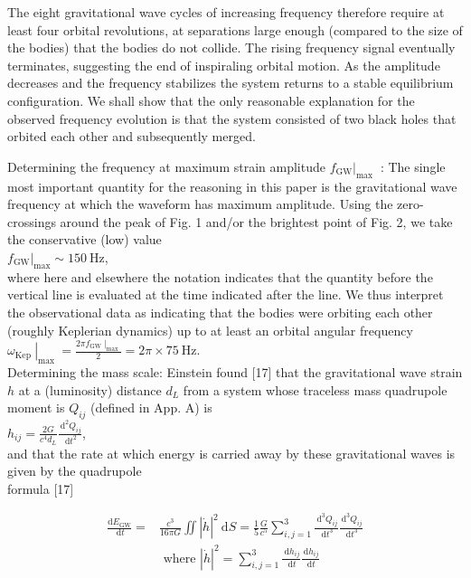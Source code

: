 \documentclass[10pt]{article}
\begin{document}
The eight gravitational wave cycles of increasing frequency therefore require at least four orbital revolutions, at separations large enough (compared to the size of the bodies) that the bodies do not collide. The rising frequency signal eventually terminates, suggesting the end of inspiraling orbital motion. As the amplitude decreases and the frequency stabilizes the system returns to a stable equilibrium configuration. We shall show that the only reasonable explanation for the observed frequency evolution is that the system consisted of two black holes that orbited each other and subsequently merged.

Determining the frequency at maximum strain amplitude $\left.f_{\mathrm{GW}}\right|_{\text {max }}$ : The single most important quantity for the reasoning in this paper is the gravitational wave frequency at which the waveform has maximum amplitude. Using the zero-crossings around the peak of Fig. 1 and/or the brightest point of Fig. 2, we take the conservative (low) value\\
$\left.f_{\mathrm{GW}}\right|_{\max } \sim 150 \mathrm{~Hz}$,\\
where here and elsewhere the notation indicates that the quantity before the vertical line is evaluated at the time indicated after the line. We thus interpret the observational data as indicating that the bodies were orbiting each other (roughly Keplerian dynamics) up to at least an orbital angular frequency\\
$\left.\omega_{\text {Kep }}\right|_{\text {max }}=\frac{\left.2 \pi f_{\text {GW }}\right|_{\text {max }}}{2}=2 \pi \times 75 \mathrm{~Hz}$.\\[0pt]
Determining the mass scale: Einstein found [17] that the gravitational wave strain $h$ at a (luminosity) distance $d_{L}$ from a system whose traceless mass quadrupole moment is $Q_{i j}$ (defined in App. A) is\\
$h_{i j}=\frac{2 G}{c^{4} d_{L}} \frac{\mathrm{~d}^{2} Q_{i j}}{\mathrm{~d} t^{2}}$,\\
and that the rate at which energy is carried away by these gravitational waves is given by the quadrupole\\[0pt]
formula [17]


\begin{align*}
\frac{\mathrm{d} E_{\mathrm{GW}}}{\mathrm{~d} t}= & \frac{c^{3}}{16 \pi G} \iint|\dot{h}|^{2} \mathrm{~d} S=\frac{1}{5} \frac{G}{c^{5}} \sum_{i, j=1}^{3} \frac{\mathrm{~d}^{3} Q_{i j}}{\mathrm{~d} t^{3}} \frac{\mathrm{~d}^{3} Q_{i j}}{\mathrm{~d} t^{3}}  \tag{5}\\
& \text { where }|\dot{h}|^{2}=\sum_{i, j=1}^{3} \frac{\mathrm{~d} h_{i j}}{\mathrm{~d} t} \frac{\mathrm{~d} h_{i j}}{\mathrm{~d} t}
\end{align*}
\end{document}
